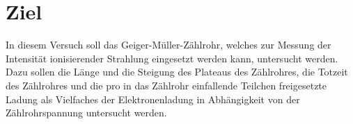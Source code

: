\section{Ziel}
\label{sec:Ziel}
In diesem Versuch soll das Geiger-Müller-Zählrohr, welches zur Messung der Intensität
ionisierender Strahlung eingesetzt werden kann, untersucht werden. Dazu sollen
die Länge und die Steigung des Plateaus des Zählrohres, die Totzeit des Zählrohres
und die pro in das Zählrohr einfallende Teilchen freigesetzte Ladung als Vielfaches
der Elektronenladung in Abhängigkeit von der Zählrohrspannung untersucht werden.
